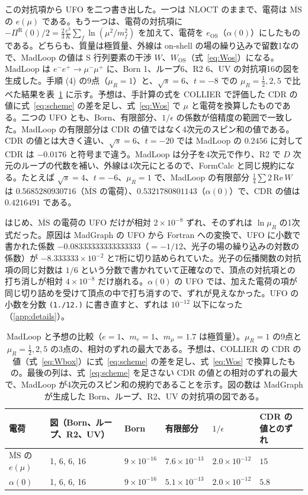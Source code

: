\documentclass[a4paper,10pt]{ltjsarticle}
\newcommand{\MSbar}{\overline{\mathrm{MS}}}
\begin{document}
この対抗項から UFO を二つ書き出した。一つは NLOCT のままで、電荷は $\MSbar$ の $e(\mu)$ である。もう一つは、電荷の対抗項に $-\Pi^{\mathrm R}(0)/2=\frac23\frac{e^2}{K}\sum_f\ln(\mu^2/m_f^2)$ を加えて、電荷を $e_{\mathrm{OS}}$（$\alpha(0)$）にしたものである。どちらも、質量は極質量、外線は on-shell の場の繰り込みで留数1なので、MadLoop の値は S 行列要素の干渉 $W$、$W_{\mathrm{OS}}$（式~\eqref{eq:Wos}）になる。MadLoop は $e^-e^+\to\mu^-\mu^+$ に、Born 1、ループ6、R2 6、UV の対抗項16の図を生成した。手順 (4) の9点（$\mu_R=1$）と、$\sqrt s=6$、$t=-8$ での $\mu_R=\frac12,2,5$ で比べた結果を表~\ref{tab:madloop} に示す。予想は、手計算の式を COLLIER で評価した CDR の値に式~\eqref{eq:scheme} の差を足し、式~\eqref{eq:Wos} で $\mu$ と電荷を換算したものである。二つの UFO とも、Born、有限部分、$1/\epsilon$ の係数が倍精度の範囲で一致した。MadLoop の有限部分は CDR の値ではなく4次元のスピン和の値である。CDR の値とは大きく違い、$\sqrt s=6$、$t=-20$ では MadLoop の $0.2456$ に対して CDR は $-0.0176$ と符号まで違う。MadLoop は分子を4次元で作り、R2 で $D$ 次元のループの代数を補い、外線は4次元にとるので、FormCalc と同じ規約になる。たとえば $\sqrt s=4$、$t=-6$、$\mu_R=1$ で、MadLoop の有限部分 $\frac14\sum2\,\mathrm{Re}\,W$ は $0.5685280930716$（$\MSbar$ の電荷）、$0.5321780801143$（$\alpha(0)$）で、CDR の値は $0.4216491$ である。

はじめ、$\MSbar$ の電荷の UFO だけが相対 $2\times10^{-8}$ ずれ、そのずれは $\ln\mu_R$ の1次式だった。原因は MadGraph の UFO から Fortran への変換で、UFO に小数で書かれた係数 $-0.08333333333333333$（$=-1/12$、光子の場の繰り込みの対数の係数）が $-8.333333\times10^{-2}$ と7桁に切り詰められていた。光子の伝播関数の対抗項の同じ対数は $1/6$ という分数で書かれていて正確なので、頂点の対抗項との打ち消しが相対 $4\times10^{-8}$ だけ崩れる。$\alpha(0)$ の UFO では、加えた電荷の項が同じ切り詰めを受けて頂点の中で打ち消すので、ずれが見えなかった。UFO の小数を分数 \texttt{(1./12.)} に書き直すと、ずれは $10^{-12}$ 以下になった（\ref{app:details}）。

\begin{table}[tbp]
\centering\small
\caption{MadLoop と予想の比較（$e=1$、$m_e=1$、$m_\mu=1.7$ は極質量）。$\mu_R=1$ の9点と $\mu_R=\frac12,2,5$ の3点の、相対のずれの最大である。予想は、COLLIER の CDR の値（式~\eqref{eq:Wbox}）に式~\eqref{eq:scheme} の差を足し、式~\eqref{eq:Wos} で換算したもの。最後の列は、式~\eqref{eq:scheme} を足さない CDR の値との相対のずれの最大で、MadLoop が4次元のスピン和の規約であることを示す。図の数は MadGraph が生成した Born、ループ、R2、UV の対抗項の図である。}
\label{tab:madloop}
\begin{tabular}{llllll}
\toprule
電荷 & 図（Born、ループ、R2、UV） & Born & 有限部分 & $1/\epsilon$ & CDR の値とのずれ \\
\midrule
$\MSbar$ の $e(\mu)$ & 1, 6, 6, 16 & $9\times10^{-16}$ & $7.6\times10^{-13}$ & $2.0\times10^{-12}$ & $15$ \\
$\alpha(0)$ & 1, 6, 6, 16 & $9\times10^{-16}$ & $5.1\times10^{-13}$ & $2.0\times10^{-12}$ & $5.8$ \\
\bottomrule
\end{tabular}
\end{table}
\end{document}
